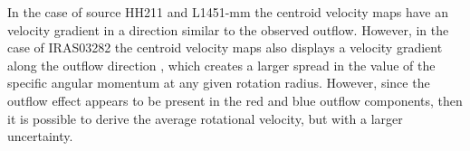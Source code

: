 In the case of source HH211 and L1451-mm the centroid velocity maps have an velocity gradient 
in a direction similar to the observed outflow. 
However, in the case of IRAS03282 the centroid velocity maps also displays a velocity gradient 
along the outflow direction \citep{Tobin_2011}, which creates a larger spread in the value of the 
specific angular momentum at any given rotation radius.
However, since the outflow effect appears to be present in the red and blue outflow components, then 
it is possible to derive the average rotational velocity, but with a larger uncertainty.